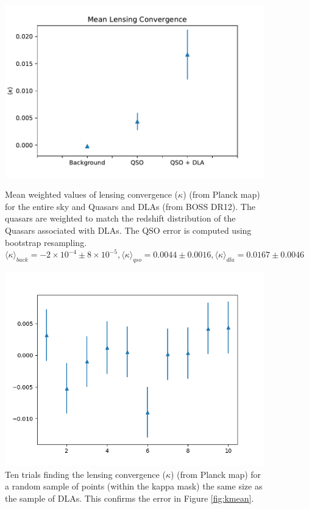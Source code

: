 \documentclass{amsart}
\begin{document}
\begin{figure}
  \includegraphics[width=\linewidth]{weighted.pdf}
  \caption{Mean weighted values of lensing convergence ($\kappa$) (from Planck map) for the entire sky and Quasars and DLAs (from BOSS DR12). The quasars are weighted to match the redshift distribution of the Quasars associated with DLAs. The QSO error is computed using bootstrap resampling. $\langle\kappa\rangle_{back} =-2 \times 10^{-4} \pm 8 \times 10^{-5}  , \langle\kappa\rangle_{qso} = 0.0044 \pm 0.0016, \langle\kappa\rangle_{dla} = 0.0167 \pm 0.0046$  }
  \label{fig:kmean}

  \includegraphics[width=\linewidth]{testfig.png}
  \caption{Ten trials finding the lensing convergence ($\kappa$) (from Planck map) for a random sample of points (within the kappa mask) the same size as the sample of DLAs. This confirms the error in Figure \ref{fig:kmean}.}
  \label{fig:ktest}
\end{figure}
\end{document}
